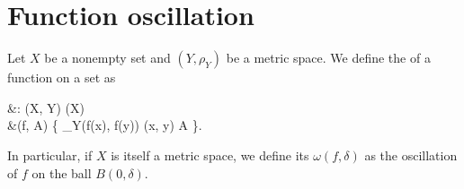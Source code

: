 \section{Function oscillation}\label{sec:function_oscillation}

\begin{definition}\label{def:function_oscillation}
  Let \( X \) be a nonempty set and \( (Y, \rho_{Y}) \) be a metric space. We define the  of a function on a set as
  \begin{balign*}
     &\omega: \fun(X, Y) \times \pow(X) \to [0, \infty] \\
     &\omega(f, A) \coloneqq \sup \Big\{ \rho_{Y}(f(x), f(y)) \colon (x, y) \in A \Big\}.
  \end{balign*}

  In particular, if \( X \) is itself a metric space, we define its  \( \omega(f, \delta) \) as the oscillation of \( f \) on the ball \( B(0, \delta) \).
\end{definition}

